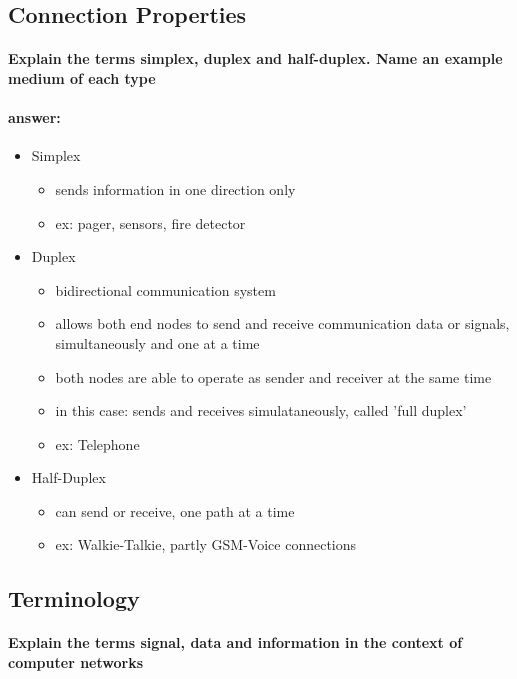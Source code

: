 \documentclass[a4paper,12pt]{article}
\begin{document}
 
 \subsection{Connection Properties}
 \paragraph{Explain the terms simplex, duplex and half-duplex. Name an example medium of each type}
 \paragraph{answer:}
 \begin{itemize}
 	\item Simplex
 	 \begin{itemize}
 		\item  sends information in one direction only
 		\item  ex: pager, sensors, fire detector
 	\end{itemize}
 
 	\item Duplex
 	\begin{itemize}
 		\item  bidirectional communication system
 		\item  allows both end nodes to send and receive communication data or signals, simultaneously and one at a time
 		\item  both nodes are able to operate as sender and receiver at the same time
 		\item  in this case: sends and receives simulataneously, called 'full duplex'
 		\item  ex: Telephone
 	\end{itemize}
 
 	\item Half-Duplex
 	\begin{itemize}
 		\item  can send or receive, one path at a time
 		\item  ex: Walkie-Talkie, partly GSM-Voice connections
 	\end{itemize}
 \end{itemize}
 
  \subsection{Terminology}
 \paragraph{Explain the terms signal, data and information in the context of computer networks}
\end{document}
